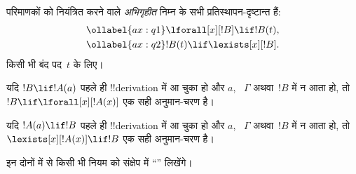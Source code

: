 \documentclass[../../../include/open-logic-section]{subfiles}
\begin{document}


\begin{defn}[परिमाणकों के अभिगृहीत]
परिमाणकों को नियंत्रित करने वाले \emph{अभिगृहीत} निम्न के सभी
प्रतिस्थापन-दृष्टान्त हैं:
\begin{align}
\ollabel{ax:q1} & \lforall[x][!B] \lif !B(t), \\
\ollabel{ax:q2} & {}!B(t) \lif \lexists[x][!B].
\end{align}
किसी भी बंद पद~$t$ के लिए।
\end{defn}

\begin{defn}[परिमाणकों के नियम]
\item यदि $!B \lif !A(a)$ पहले ही !!{derivation} में आ चुका हो और $a$,
  ~$\Gamma$ अथवा~$!B$ में न आता हो, तो $!B \lif
  \lforall[x][!A(x)]$ एक सही अनुमान-चरण है।
\item यदि $!A(a) \lif !B$ पहले ही !!{derivation} में आ चुका हो और $a$,
  ~$\Gamma$ अथवा~$!B$ में न आता हो, तो $\lexists[x][!A(x)] \lif
  !B$ एक सही अनुमान-चरण है।
\end{defn}

इन दोनों में से किसी भी नियम को संक्षेप में ``\QR'' लिखेंगे।
\end{document}
